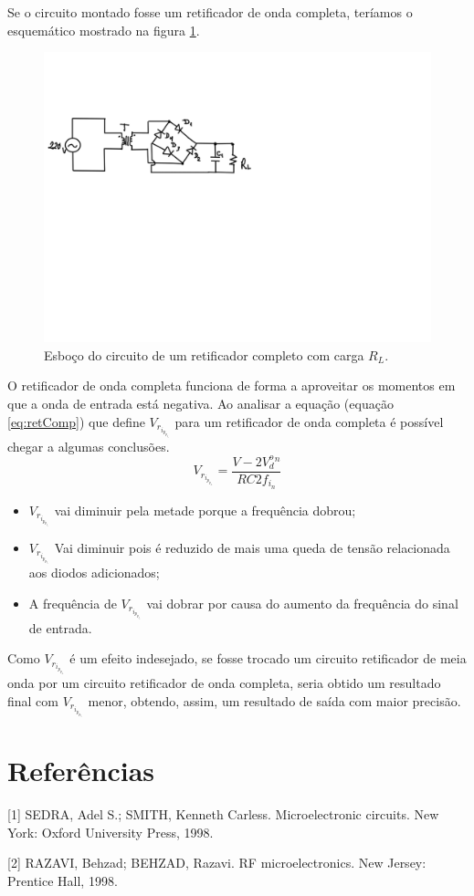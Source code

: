 \documentclass{abntex2}
\begin{document}
Se o circuito montado fosse um retificador de onda completa, teríamos o esquemático mostrado na figura \ref{fig:retComp}.

\begin{figure}[h]
  \centering
  \includegraphics[scale = .7]{retComp.png}
  \caption{Esboço do circuito de um retificador completo com carga $R_L$.}
  \label{fig:retComp}
\end{figure}

O retificador de onda completa funciona de forma a aproveitar os momentos em que a onda de entrada está negativa. Ao analisar a equação (equação  \ref{eq:retComp}) que define $V_r_i_p_p_l_e$ para um retificador de onda completa é possível
chegar a algumas conclusões.
\begin{equation}
  V_r_i_p_p_l_e = \frac{V-2V_d^o^n}{RC2f_i_n}
  \label{eq:retComp}
\end{equation}

\begin{itemize}
  \item $V_r_i_p_p_l_e$ vai diminuir pela metade porque a frequência dobrou;
  \item $V_r_i_p_p_l_e$ Vai diminuir pois é reduzido de mais uma queda de tensão relacionada aos diodos adicionados;
  \item A frequência de $V_r_i_p_p_l_e$ vai dobrar por causa do aumento da frequência do sinal de entrada.
\end{itemize}

Como $V_r_i_p_p_l_e$ é um efeito indesejado, se fosse trocado um circuito retificador de meia onda por um circuito retificador de onda completa,
seria obtido um resultado final com $V_r_i_p_p_l_e$ menor, obtendo, assim, um resultado de saída com maior precisão.

\section*{Referências}


[1] SEDRA, Adel S.; SMITH, Kenneth Carless. Microelectronic circuits. New York: Oxford University Press, 1998.

[2] RAZAVI, Behzad; BEHZAD, Razavi. RF microelectronics. New Jersey: Prentice Hall, 1998.
\end{document}
